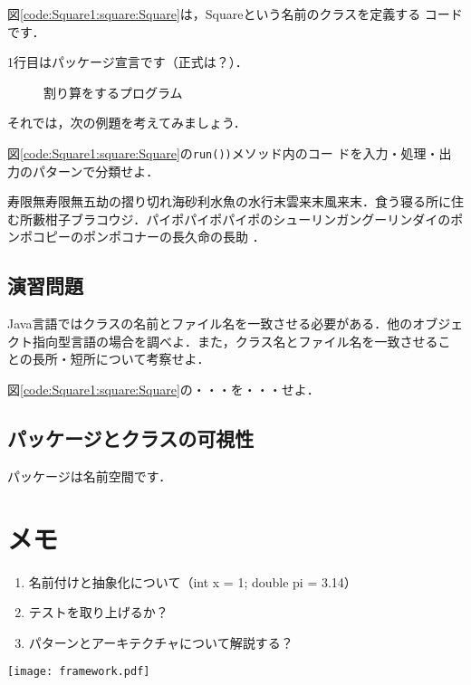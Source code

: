\documentclass[a4j,papersize]{jsbook}
\begin{document}
図\ref{code:Square1:square:Square}は，Squareという名前のクラスを定義する
コードです．

1行目はパッケージ宣言です（正式は？）．

\begin{figure}

\caption{割り算をするプログラム} 
\end{figure}

それでは，次の例題を考えてみましょう．

\begin{例題}
 図\ref{code:Square1:square:Square}の\texttt{run())}メソッド内のコー
 ドを入力・処理・出力のパターンで分類せよ．
\end{例題}

寿限無寿限無五劫の摺り切れ海砂利水魚の水行末雲来末風来末．食う寝る所に住む所藪柑子ブラコウジ．パイポパイポパイポのシューリンガングーリンダイのポンポコピーのポンポコナーの長久命の長助
．

\section{演習問題}

\begin{演習}
 Java言語ではクラスの名前とファイル名を一致させる必要がある．他のオブジェ
 クト指向型言語の場合を調べよ．また，クラス名とファイル名を一致させるこ
 との長所・短所について考察せよ．
\end{演習}

\begin{演習}
 図\ref{code:Square1:square:Square}の・・・を・・・せよ．
\end{演習}

\section{パッケージとクラスの可視性}
パッケージは名前空間です．

\chapter{メモ}

\begin{enumerate}
 \item 名前付けと抽象化について（int x = 1; double pi = 3.14）
 \item テストを取り上げるか？
 \item パターンとアーキテクチャについて解説する？
\end{enumerate}

\texttt{[image: framework.pdf]}
\end{document}
